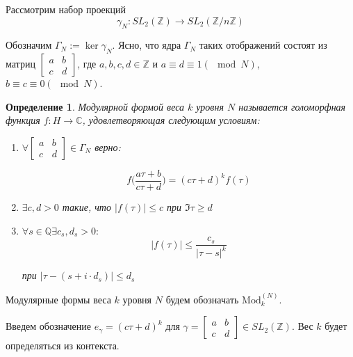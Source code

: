 \documentclass{article}
\newcommand{\ZZ}{\mathbb{Z}}
\newcommand{\CC}{\mathbb{C}}
\newcommand{\QQ}{\mathbb{Q}}
\theoremstyle{break}
\newtheorem{definition}[theorem]{Определение}
\newcommand{\ModkN}[2]{\text{Mod}_{#1}^{(#2)}}
\begin{document}
Рассмотрим набор проекций
\begin{equation}
		\gamma_N: SL_2(\ZZ) \to SL_2 (\ZZ / n \ZZ)
\end{equation}


Обозначим $\Gamma_N := \ker \gamma_N$. Ясно, что ядра $\Gamma_N$ таких отображений состоят из матриц $\begin{bmatrix} a & b \\ c & d \end{bmatrix}$, где $a, b, c, d \in \ZZ$ и $a \equiv d \equiv 1(\mod N)$, $b \equiv c \equiv 0(\mod N)$.


\begin{definition}
	Модулярной формой веса $k$ уровня $N$ называется голоморфная функция $f: H \to \CC$, удовлетворяющая следующим условиям:
	
	\begin{enumerate}[start=1, label={(\bfseries M\arabic*):}]
		\item $\forall \begin{bmatrix}
			a & b \\ c & d
		\end{bmatrix} \in \Gamma_N$ верно:

	\begin{equation}
			f \Big( \frac{a\tau + b}{c\tau + d} \Big) = (c\tau + d)^k f(\tau)
	\end{equation}

	
	
		\item $\exists c, d >0$ такие, что $|f(\tau)| \le c$
				при $\Im \tau \ge d$
	
		\item $\forall s \in \QQ \exists c_s, d_s > 0:$
		\begin{equation}
			|f(\tau)| \le \frac{c_s}{|\tau - s|^k}
		\end{equation}
			
		при $|\tau - (s + i \cdot d_s)| \le d_s$
	\end{enumerate}
\end{definition}



Модулярные формы веса $k$ уровня $N$ будем обозначать $\ModkN{k}{N}$. 

Введем обозначение $e_\gamma=(c \tau + d)^k$ для $ \gamma = \begin{bmatrix}
	a & b \\ c & d \end{bmatrix}\in SL_2(\ZZ)$. Вес $k$ будет определяться из контекста.
\end{document}
